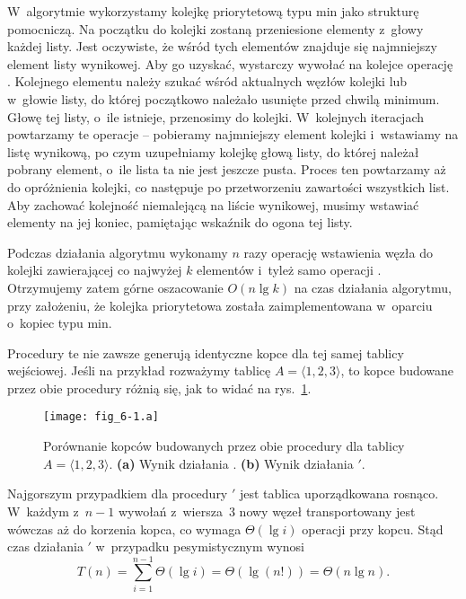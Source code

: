 \exercise %
W~algorytmie wykorzystamy kolejkę priorytetową typu min jako strukturę pomocniczą.
Na początku do kolejki zostaną przeniesione elementy z~głowy każdej listy.
Jest oczywiste, że wśród tych elementów znajduje się najmniejszy element listy wynikowej.
Aby go uzyskać, wystarczy wywołać na kolejce operację .
Kolejnego elementu należy szukać wśród aktualnych węzłów kolejki lub w~głowie listy, do której początkowo należało usunięte przed chwilą minimum.
Głowę tej listy, o~ile istnieje, przenosimy do kolejki.
W~kolejnych iteracjach powtarzamy te operacje -- pobieramy najmniejszy element kolejki i~wstawiamy na listę wynikową, po czym uzupełniamy kolejkę głową listy, do której należał pobrany element, o~ile lista ta nie jest jeszcze pusta.
Proces ten powtarzamy aż do opróżnienia kolejki, co następuje po przetworzeniu zawartości wszystkich list.
Aby zachować kolejność niemalejącą na liście wynikowej, musimy wstawiać elementy na jej koniec, pamiętając wskaźnik do ogona tej listy.

Podczas działania algorytmu wykonamy $n$ razy operację wstawienia węzła do kolejki zawierającej co najwyżej $k$ elementów i~tyleż samo operacji .
Otrzymujemy zatem górne oszacowanie $O(n\lg k)$ na czas działania algorytmu, przy założeniu, że kolejka priorytetowa została zaimplementowana w~oparciu o~kopiec typu min.

\problems


\subproblem %
Procedury te nie zawsze generują identyczne kopce dla tej samej tablicy wejściowej.
Jeśli na przykład rozważymy tablicę $A=\langle1,2,3\rangle$, to kopce budowane przez obie procedury różnią się, jak to widać na rys.~\ref{fig:6-1(a)}.
\begin{figure}[ht]
	\begin{center}
		\texttt{[image: fig\_6-1.a]}
	\end{center}
	\caption{Porównanie kopców budowanych przez obie procedury dla tablicy $A=\langle1,2,3\rangle$.
{\sffamily\bfseries(a)} Wynik działania .
{\sffamily\bfseries(b)} Wynik działania $'$.} \label{fig:6-1(a)}
\end{figure}

\subproblem %
Najgorszym przypadkiem dla procedury $'$ jest tablica uporządkowana rosnąco.
W~każdym z~$n-1$ wywołań  z~wiersza~3 nowy węzeł transportowany jest wówczas aż do korzenia kopca, co wymaga $\Theta(\lg i)$ operacji przy  kopcu.
Stąd czas działania $'$ w~przypadku pesymistycznym wynosi
\[
	T(n) = \sum_{i=1}^{n-1}\Theta(\lg i) = \Theta(\lg(n!)) = \Theta(n\lg n).
\]

